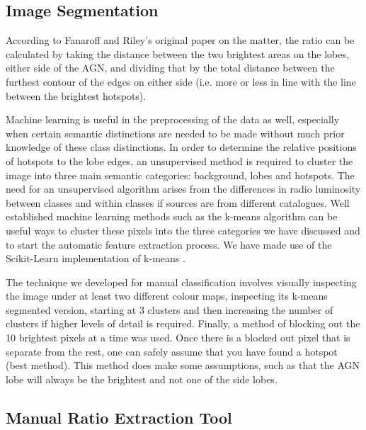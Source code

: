 \documentclass[conference]{IEEEtran}
\begin{document}
\subsection{Image Segmentation}
According to Fanaroff and Riley's original paper on the matter, the ratio can be calculated by taking the distance between the two brightest areas on the lobes, either side of the AGN, and dividing that by the total distance between the furthest contour of the edges on either side (i.e. more or less in line with the line between the brightest hotspots).

Machine learning is useful in the preprocessing of the data as well, especially when certain semantic distinctions are needed to be made without much prior knowledge of these class distinctions. In order to determine the relative positions of hotspots to the lobe edges, an unsupervised method is required to cluster the image into three main semantic categories: background, lobes and hotspots. The need for an unsupervised algorithm arises from the differences in radio luminosity between classes and within classes if sources are from different catalogues.
Well established machine learning methods such as the k-means 
algorithm \cite{macqueen1967} can be useful ways to 
cluster these pixels into the three categories we have discussed and to start the automatic feature extraction process. We have made use of the Scikit-Learn implementation of k-means \cite{scikit-learn}. 

The technique we developed for manual classification involves visually inspecting the image under at least two different colour maps, inspecting its k-means segmented version, starting at 3 clusters and then increasing the number of clusters if higher levels of detail is required. Finally, a method of blocking out the 10 brightest pixels at a time was used. Once there is a blocked out pixel that is separate from the rest, one can safely assume that you have found a hotspot (best method). This method does make some assumptions, such as that the AGN lobe will always be the brightest and not one of the side lobes.

\subsection{Manual Ratio Extraction Tool}
\end{document}
